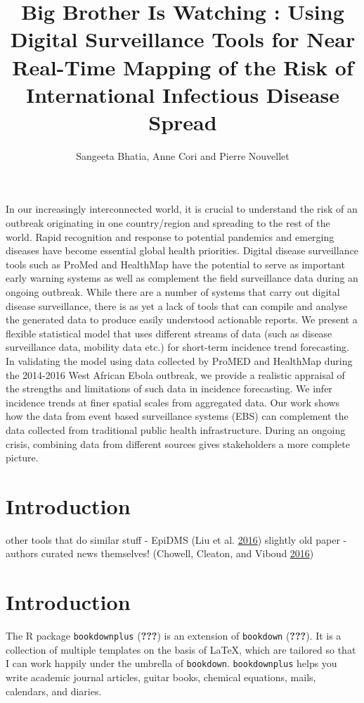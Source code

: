 \documentclass[]{article}
\title{Big Brother Is Watching : Using Digital Surveillance Tools for Near
Real-Time Mapping of the Risk of International Infectious Disease Spread}
\author{Sangeeta Bhatia, Anne Cori and Pierre Nouvellet}
\date{}
\begin{document}
\maketitle

In our increasingly interconnected world, it is crucial to understand
the risk of an outbreak originating in one country/region and spreading
to the rest of the world. Rapid recognition and response to potential
pandemics and emerging diseases have become essential global health
priorities. Digital disease surveillance tools such as ProMed and
HealthMap have the potential to serve as important early warning systems
as well as complement the field surveillance data during an ongoing
outbreak. While there are a number of systems that carry out digital
disease surveillance, there is as yet a lack of tools that can compile
and analyse the generated data to produce easily understood actionable
reports. We present a flexible statistical model that uses different
streams of data (such as disease surveillance data, mobility data etc.)
for short-term incidence trend forecasting.\\
In validating the model using data collected by ProMED and HealthMap
during the 2014-2016 West African Ebola outbreak, we provide a realistic
appraisal of the strengths and limitations of such data in incidence
forecasting. We infer incidence trends at finer spatial scales from
aggregated data. Our work shows how the data from event based
surveillance systems (EBS) can complement the data collected from
traditional public health infrastructure. During an ongoing crisis,
combining data from different sources gives stakeholders a more complete
picture.

\section{Introduction}\label{introduction}

other tools that do similar stuff - EpiDMS (Liu et al.
\protect\hyperlink{ref-liu2016epidms}{2016}) slightly old paper -
authors curated news themselves! (Chowell, Cleaton, and Viboud
\protect\hyperlink{ref-chowell2016elucidating}{2016})

\section{Introduction}\label{introduction-1}

The R package \texttt{bookdownplus} ({\textbf{???}}) is an extension of
\texttt{bookdown} ({\textbf{???}}). It is a collection of multiple
templates on the basis of LaTeX, which are tailored so that I can work
happily under the umbrella of \texttt{bookdown}. \texttt{bookdownplus}
helps you write academic journal articles, guitar books, chemical
equations, mails, calendars, and diaries.
\end{document}
